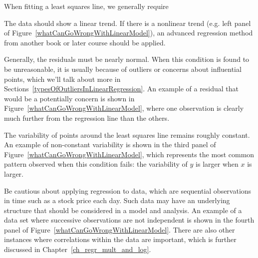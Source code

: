 \noindent%
When fitting a least squares line, we generally require
\begin{description}
\setlength{\itemsep}{0mm}
\item[Linearity.]
    The data should show a linear trend.
    If there is a nonlinear trend (e.g. left panel of
    Figure~\ref{whatCanGoWrongWithLinearModel}),
    an advanced regression method from another book
    or later course should be applied.
\item[Nearly normal residuals.]
    Generally, the residuals must be nearly normal.
    When this condition is found to be unreasonable,
    it is usually because of outliers or concerns
    about influential points,
    which we'll talk about more in
    Sections~\ref{typesOfOutliersInLinearRegression}.
    An example of a residual that would be a potentially
    concern is shown in
    Figure~\ref{whatCanGoWrongWithLinearModel},
    where one observation is clearly much further from the
    regression line than the others.
\item[Constant variability.]
    The variability of points around the least squares line
    remains roughly constant.
    An example of non-constant variability is shown in the
    third panel of Figure~\ref{whatCanGoWrongWithLinearModel},
    which represents the most common pattern observed
    when this condition fails:
    the variability of $y$ is larger when $x$ is larger.
\item[Independent observations.]
    Be cautious about applying regression to 
    data, which are sequential observations in time such as a
    stock price each day.
    Such data may have an underlying structure that should
    be considered in a model and analysis.
    An example of a data set where successive observations
    are not independent is shown in the fourth panel of
    Figure~\ref{whatCanGoWrongWithLinearModel}.
    There are also other instances where correlations within
    the data are important, which is further discussed in
    Chapter~\ref{ch_regr_mult_and_log}.
\end{description}

